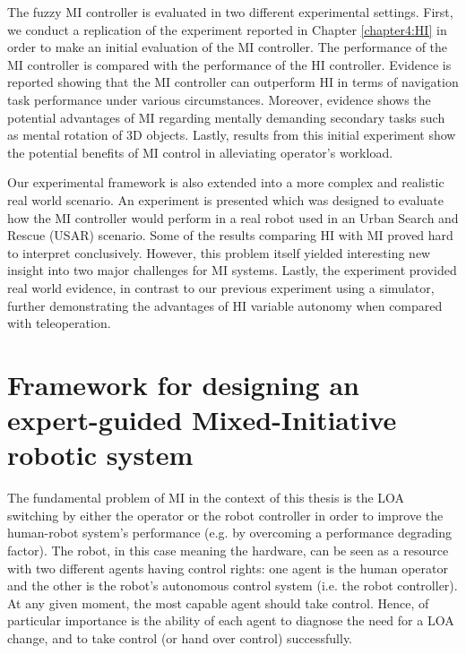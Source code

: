 \documentclass[a4paper,12pt,oneside,openright]{bhamthesis}
\begin{document}
The fuzzy MI controller is evaluated in two different experimental settings. First, we conduct a replication of the experiment reported in Chapter \ref{chapter4:HI} in order to make an initial evaluation of the MI controller. The performance of the MI controller is compared with the performance of the HI controller. Evidence is reported showing that the MI controller can outperform HI in terms of navigation task performance under various circumstances. Moreover, evidence shows the potential advantages of MI regarding mentally demanding secondary tasks such as mental rotation of 3D objects. Lastly, results from this initial experiment show the potential benefits of MI control in alleviating operator's workload.

Our experimental framework is also extended into a more complex and realistic real world scenario. An experiment is presented which was designed to evaluate how the MI controller would perform in a real robot used in an Urban Search and Rescue (USAR) scenario. Some of the results comparing HI with MI proved hard to interpret conclusively. However, this problem itself yielded interesting new insight into two major challenges for MI systems. Lastly, the experiment provided real world evidence, in contrast to our previous experiment using a simulator, further demonstrating the advantages of HI variable autonomy when compared with teleoperation.

\section{Framework for designing an expert-guided Mixed-Initiative robotic system}
\label{chapter5:general_expert_MI}

The fundamental problem of MI in the context of this thesis is the LOA switching by either the operator or the robot controller in order to improve the human-robot system's performance (e.g. by overcoming a performance degrading factor). The robot, in this case meaning the hardware, can be seen as a resource with two different agents having control rights: one agent is the human operator and the other is the robot's autonomous control system (i.e. the robot controller). At any given moment, the most capable agent should take control. Hence, of particular importance is the ability of each agent to diagnose the need for a LOA change, and to take control (or hand over control) successfully.
\end{document}
